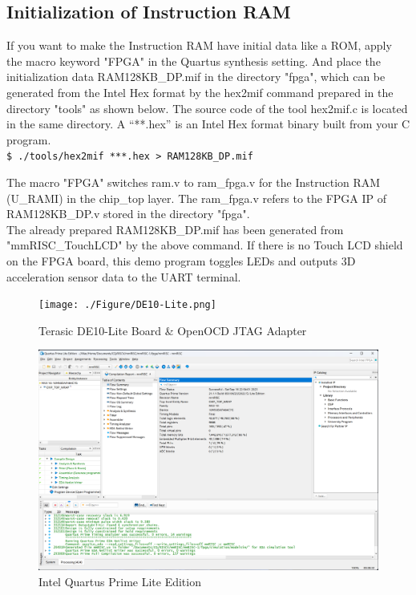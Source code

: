 \subsection{Initialization of Instruction RAM}

If you want to make the Instruction RAM have initial data like a ROM, apply the macro keyword "FPGA" in the Quartus synthesis setting. And place the initialization data RAM128KB\_DP.mif in the directory "fpga", which can be generated from the Intel Hex format by the hex2mif command prepared in the directory "tools" as shown below. The source code of the tool hex2mif.c is located in the same directory. A “**.hex” is an Intel Hex format binary built from your C program.\\

\texttt{\$ ./tools/hex2mif ***.hex >  RAM128KB\_DP.mif}

The macro "FPGA" switches ram.v to ram\_fpga.v for the Instruction RAM (U\_RAMI) in the chip\_top layer. The ram\_fpga.v refers to the FPGA IP of RAM128KB\_DP.v stored in the directory "fpga".\\

The already prepared RAM128KB\_DP.mif has been generated from "mmRISC\_TouchLCD" by the above command. If there is no Touch LCD shield on the FPGA board, this demo program toggles LEDs and outputs 3D acceleration sensor data to the UART terminal.


\begin{figure}[H]
    \texttt{[image: ./Figure/DE10-Lite.png]}
    \caption{Terasic DE10-Lite Board \& OpenOCD JTAG Adapter}
    \label{fig:DE10LITE}
\end{figure}

\begin{figure}[H]
    \includegraphics[width=1.0\columnwidth]{./Figure/QuestaPrime.png}
    \caption{Intel Quartus Prime Lite Edition}
    \label{fig:QUESTAPRIME}
\end{figure}

